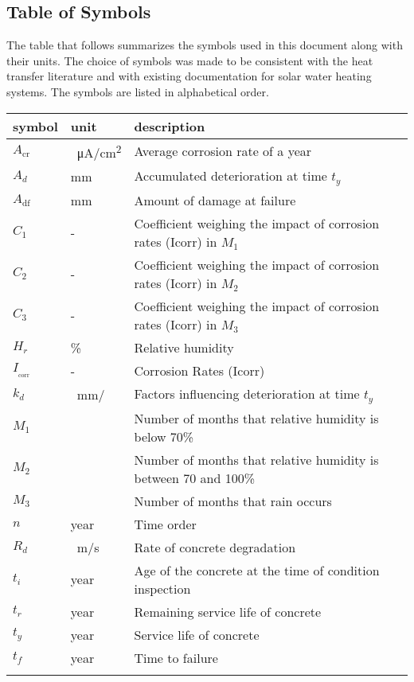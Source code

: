 \documentclass[12pt]{article}
\begin{document}
\subsection{Table of Symbols}

The table that follows summarizes the symbols used in this document along with
their units.  The choice of symbols was made to be consistent with the heat
transfer literature and with existing documentation for solar water heating
systems.  The symbols are listed in alphabetical order.

\renewcommand{\arraystretch}{1.2}
\noindent \begin{longtable*}{l l p{12cm}} \toprule
\textbf{symbol} & \textbf{unit} & \textbf{description}\\
\midrule 
$A_\text{cr}$ & \si[per-mode=symbol]{{}\micro\ampere\per\centi\meter\squared}& Average corrosion rate of a year \\
$A_d$ & \si[per-mode=symbol] {\milli\meter} & Accumulated deterioration at time $t_y$ \\
$A_\text{df}$ & \si[per-mode=symbol] {\milli\meter} & Amount of damage at failure \\
$C_1$ & - & Coefficient weighing the impact of corrosion rates (Icorr) in $M_1$\\
$C_2$ & - & Coefficient weighing the impact of corrosion rates (Icorr) in $M_2$\\
$C_3$ & - & Coefficient weighing the impact of corrosion rates (Icorr) in $M_3$\\

$H_r$ & \% & Relative humidity\\
$I__\text{corr}$ & - & Corrosion Rates (Icorr)\\

$k_d$ & \si[per-mode=symbol]{{}\milli\meter\per{}} & Factors influencing deterioration at time $t_y$ \\

$M_1$ & \SI{}{} & Number of months that relative humidity is below 70\%\\
$M_2$ & \SI{}{} & Number of months that relative humidity is between 70 and 100\% \\
$M_3$ & \SI{}{} & Number of months that rain occurs\\

$n$ & year & Time order \\

$R_d$ & \si[per-mode=symbol]{{}\meter\per\second} & Rate of concrete degradation \\

$t_i$ & year & Age of the concrete at the time of condition inspection\\
$t_r$ & year & Remaining service life of concrete\\
$t_y$ & year & Service life of concrete\\
$t_f$ & year & Time to failure\\

\\ 
\bottomrule
\end{longtable*}
\end{document}
